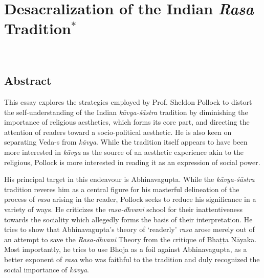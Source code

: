 \chapter[Desacralization of the Indian \textsl{Rasa} Tradition]{Desacralization of the Indian \textsl{Rasa} Tradition$^{*}$}\label{chapter\thechapter:begin}

~

\vskip 10pt

\section*{Abstract}

This essay explores the strategies employed by Prof. Sheldon Pollock to distort the self-understanding of the Indian \textsl{kāvya-śāstra} tradition by diminishing the importance of religious aesthetics, which forms its core part, and directing the attention of readers toward a socio-political aesthetic. He is also keen on separating Veda-s from \textsl{kāvya}. While the tradition itself appears to have been more interested in \textsl{kāvya} as the source of an aesthetic experience akin to the religious, Pollock is more interested in reading it as an expression of social power. 

His principal target in this endeavour is Abhinavagupta. While the \textsl{kāvya-śāstra} tradition reveres him as a central figure for his masterful delineation of the process of \textsl{rasa} arising in the reader, Pollock seeks to reduce his significance in a variety of ways. He criticizes the \textsl{rasa-dhvani} school for their inattentiveness towards the sociality which allegedly forms the basis of their interpretation. He tries to show that Abhinavagupta's theory of `readerly' \textsl{rasa} arose merely out of an attempt to save the \textsl{Rasa-dhvani} Theory from the critique of Bhaṭṭa Nāyaka. Most importantly, he tries to use Bhoja as a foil against Abhinavagupta, as a better exponent of \textsl{rasa} who was faithful to the tradition and duly recognized the social importance of \textsl{kāvya}. 

